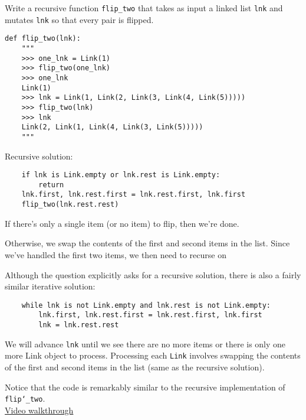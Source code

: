 \question
Write a recursive function \texttt{flip\_two} that takes as input a
linked list \texttt{lnk} and mutates \texttt{lnk} so that every pair
is flipped.

\begin{lstlisting}
def flip_two(lnk):
    """
    >>> one_lnk = Link(1)
    >>> flip_two(one_lnk)
    >>> one_lnk
    Link(1)
    >>> lnk = Link(1, Link(2, Link(3, Link(4, Link(5)))))
    >>> flip_two(lnk)
    >>> lnk
    Link(2, Link(1, Link(4, Link(3, Link(5)))))
    """
\end{lstlisting}
\begin{solution}[1.25in]
Recursive solution:
\begin{lstlisting}
    if lnk is Link.empty or lnk.rest is Link.empty:
        return
    lnk.first, lnk.rest.first = lnk.rest.first, lnk.first
    flip_two(lnk.rest.rest)
\end{lstlisting}
If there's only a single item (or no item) to flip, then we're done.

Otherwise, we swap the contents of the first and second items in the list. Since
we've handled the first two items, we then need to recurse on

Although the question explicitly asks for a recursive solution, there is also a
fairly similar iterative solution:
\begin{lstlisting}
    while lnk is not Link.empty and lnk.rest is not Link.empty:
        lnk.first, lnk.rest.first = lnk.rest.first, lnk.first
        lnk = lnk.rest.rest
\end{lstlisting}
We will advance \texttt{lnk} until we see there are no more items or there is
only one more Link object to process. Processing each \texttt{Link} involves
swapping the contents of the first and second items in the list (same as the
recursive solution).

Notice that the code is remarkably similar to the recursive implementation of
\texttt{flip\char`_two}.\\
\href{https://www.youtube.com/watch?v=wPF9gOx15V0&index=2&list=PLx38hZJ5RLZdJgRCgpaTbmRXKAHOUmomO&t=9m54s}{Video walkthrough}
\end{solution}
